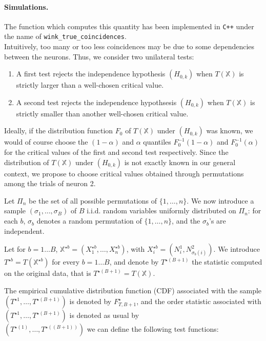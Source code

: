 \documentclass[a4paper,oneside,10pt]{article}
\newcommand{\pa}[1]{\ensuremath{\left( #1 \right)}}
\newcommand{\X}{\ensuremath{\mathds{X}}}
\newcommand{\1}[1]{\ensuremath{\mathds{1}_{\left\{ #1 \right\}}}}  %
\begin{document}
\paragraph{Simulations.} The function which computes this quantity has been implemented in \texttt{C++} under the name of \texttt{wink\_true\_coincidences}.\\


Intuitively, too many or too less coincidences may be due to some dependencies between the neurons. Thus, we consider two unilateral tests:
\begin{enumerate}
\item A first test rejects the independence hypothesis $(H_{0,k})$ when $T(\X)$ is strictly larger than a well-chosen critical value.
\item A second test rejects the independence hypothsesis $(H_{0,k})$ when $T(\X)$ is strictly smaller than another well-chosen critical value.
\end{enumerate}

Ideally, if the distribution function $F_0$ of $T( \X)$ under $(H_{0,k})$ was known, we would of course choose  the $(1-\alpha)$ and $\alpha$ quantiles $F_0^{-1}(1-\alpha)$ and $F_0^{-1}(\alpha)$ for the critical values of the first and second test respectively.
Since the distribution of $T(\X)$ under $(H_{0,k})$ is not exactly known in our general context, we propose to choose critical values obtained through  permutations among the trials of neuron 2.

Let $\Pi_n$ be the set of all possible permutations of $\{1,\ldots,n\}$.
We now introduce  a sample  $\pa{\sigma_1,\ldots,\sigma_B}$ of $B$  i.i.d. random variables uniformly distributed on $\Pi_n$: 
for each $b$, $\sigma_b$ denotes a random permutation of  $\{1,\ldots,n\}$, and the $\sigma_b$'s are independent. 

Let for $b=1\ldots B$, $\X^{\star b}=(X_1^{\star b},\ldots,X_n^{\star b})$, with $X_i^{\star b}=(N_i^1,N_{\sigma_b(i)}^2)$. We introduce $T^{\star b}=T(\X^{\star b})$ for every $b=1\ldots B$, and denote by $T^{\star (B+1)}$ the statistic computed on the original data, that is $T^{\star (B+1)}=T(\X)$.

The empirical cumulative distribution function (CDF) associated with the sample $\pa{T^{\star 1},\ldots,T^{\star (B+1)}}$ is denoted by $F^\star_{T,B+1}$, and the order statistic associated with  $\pa{T^{\star 1},\ldots,T^{\star (B+1)}}$ is denoted as usual by\\
$\pa{T^{\star (1)},\ldots,T^{\star ((B+1))}}$ we can define the following test functions:
\end{document}

